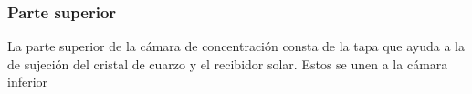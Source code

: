 			\subsubsection{Parte superior}
				
				La parte superior de la cámara de concentración consta de la tapa que ayuda a la de sujeción del cristal de cuarzo y el recibidor solar. Estos se unen a la cámara inferior
			
			
%		
%		
%		
%		
